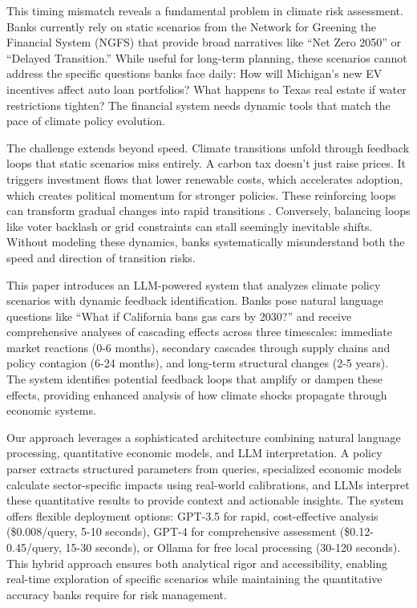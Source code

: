 \documentclass[10pt,twocolumn]{article}
\begin{document}
This timing mismatch reveals a fundamental problem in climate risk assessment. Banks currently rely on static scenarios from the Network for Greening the Financial System (NGFS) \citep{feridun2020climate} that provide broad narratives like ``Net Zero 2050'' or ``Delayed Transition.'' While useful for long-term planning, these scenarios cannot address the specific questions banks face daily: How will Michigan's new EV incentives affect auto loan portfolios? What happens to Texas real estate if water restrictions tighten? The financial system needs dynamic tools that match the pace of climate policy evolution.

The challenge extends beyond speed. Climate transitions unfold through feedback loops \citep{may1976simple} that static scenarios miss entirely. A carbon tax doesn't just raise prices. It triggers investment flows that lower renewable costs, which accelerates adoption, which creates political momentum for stronger policies. These reinforcing loops can transform gradual changes into rapid transitions \citep{scheffer2009early}. Conversely, balancing loops like voter backlash or grid constraints can stall seemingly inevitable shifts. Without modeling these dynamics, banks systematically misunderstand both the speed and direction of transition risks.

This paper introduces an LLM-powered system that analyzes climate policy scenarios with dynamic feedback identification. Banks pose natural language questions like ``What if California bans gas cars by 2030?'' and receive comprehensive analyses of cascading effects \citep{allen2000financial} across three timescales: immediate market reactions (0-6 months), secondary cascades through supply chains and policy contagion (6-24 months), and long-term structural changes (2-5 years). The system identifies potential feedback loops that amplify or dampen these effects, providing enhanced analysis of how climate shocks propagate through economic systems.

Our approach leverages a sophisticated architecture combining natural language processing, quantitative economic models, and LLM interpretation. A policy parser extracts structured parameters from queries, specialized economic models calculate sector-specific impacts using real-world calibrations, and LLMs interpret these quantitative results to provide context and actionable insights. The system offers flexible deployment options: GPT-3.5 for rapid, cost-effective analysis (\$0.008/query, 5-10 seconds), GPT-4 for comprehensive assessment (\$0.12-0.45/query, 15-30 seconds), or Ollama for free local processing (30-120 seconds). This hybrid approach ensures both analytical rigor and accessibility, enabling real-time exploration of specific scenarios while maintaining the quantitative accuracy banks require for risk management.
\end{document}
